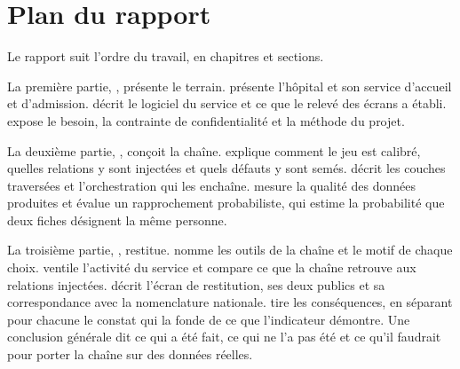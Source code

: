 \section*{Plan du rapport}

Le rapport suit l'ordre du travail, en  chapitres et
 sections.

La première partie, , présente le terrain.
 présente l'hôpital et son service d'accueil et
d'admission.  décrit le logiciel du service
et ce que le relevé des écrans a établi.  expose le
besoin, la contrainte de confidentialité et la méthode du projet.

La deuxième partie, , conçoit la chaîne.
 explique comment le jeu est calibré, quelles
relations y sont injectées et quels défauts y sont semés.  décrit les couches traversées et l'orchestration qui les enchaîne.
 mesure la qualité des données
produites et évalue un rapprochement probabiliste, qui estime la probabilité que deux fiches
désignent la même personne.

La troisième partie, , restitue.  nomme les outils de la chaîne et le motif de chaque choix.  ventile l'activité du service et compare ce que la chaîne retrouve aux relations
injectées.  décrit l'écran de restitution, ses deux publics
et sa correspondance avec la nomenclature nationale.  tire les
conséquences, en séparant pour chacune le constat qui la fonde de ce que l'indicateur démontre.
Une conclusion générale dit ce qui a été fait, ce qui ne l'a pas été et ce qu'il faudrait pour
porter la chaîne sur des données réelles.
